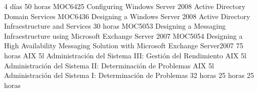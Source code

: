 \documentclass[11pt,a4paper]{moderncv}
\begin{document}
 {4 d\'ias}{}
 {50 horas}{\scriptsize{
MOC6425 Configuring Windows Server 2008 Active Directory Domain Services \newline %
MOC6436 Designing a Windows Server 2008 Active Directory Infraestructure and Services}}
 {30 horas}{\scriptsize{
MOC5053 Designing a Messaging Infraestructure using Microsoft Exchange Server 2007\newline
MOC5054 Designing a High Availability Messaging Solution with Microsoft Exchange Server2007}}
 {75 horas}{\scriptsize{
AIX 5l Administraci\'on del Sistema III: Gesti\'on del Rendimiento\newline
AIX 5l Administraci\'on del Sistema II: Determinaci\'on de Problemas\newline
AIX 5l Administraci\'on del Sistema I: Determinaci\'on de Problemas}} %
 {32 horas}{}
 {25 horas}{}
 {25 horas}{}

\end{document}
